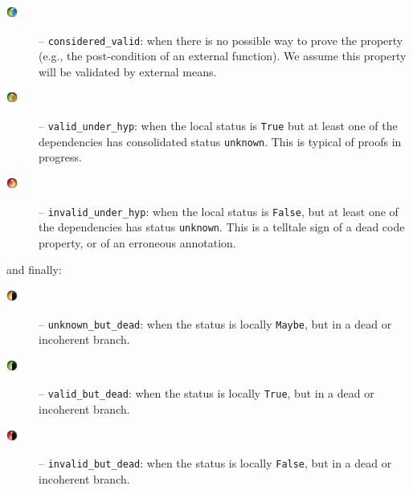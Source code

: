 \begin{description}
  \item [{\includegraphics[height=1em]{../../share/theme/default/considered_valid.png}}] %
  -- \verb+considered_valid+: when there is no possible way to prove the
  property (e.g., the post-condition of an external function). We assume this
  property will be validated by external means.
  \item [{\includegraphics[height=1em]{../../share/theme/default/valid_under_hyp.png}}] %
  -- \verb+valid_under_hyp+: when the local status is \verb+True+ but at least
  one of the dependencies has consolidated status \verb+unknown+. This is
  typical of proofs in progress.
  \item [{\includegraphics[height=1em]{../../share/theme/default/invalid_under_hyp.png}}] %
  -- \verb+invalid_under_hyp+: when the local status is \verb+False+, but at
  least one of the dependencies has status \verb+unknown+.  This is a telltale
  sign of a dead code property, or of an erroneous annotation.
\end{description}

and finally:

\begin{description}
  \item [{\includegraphics[height=1em]{../../share/theme/default/unknown_but_dead.png}}] %
  -- \verb+unknown_but_dead+: when the status is locally \verb+Maybe+, but in a
  dead or incoherent branch.
  \item [{\includegraphics[height=1em]{../../share/theme/default/valid_but_dead.png}}] %
  -- \verb+valid_but_dead+: when the status is locally \verb+True+, but in a
  dead or incoherent branch.
  \item [{\includegraphics[height=1em]{../../share/theme/default/invalid_but_dead.png}}] %
  -- \verb+invalid_but_dead+: when the status is locally
  \verb+False+, but in a dead or incoherent branch.
\end{description}

